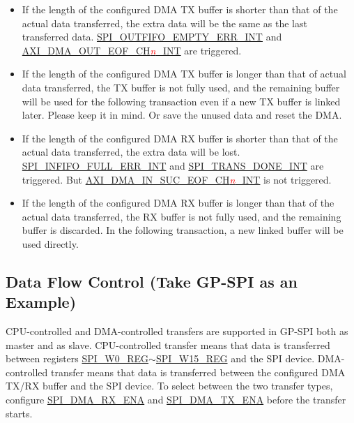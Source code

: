 \documentclass[main\_\_EN.tex]{subfiles}
\begin{document}
\begin{itemize}
    \item If the length of the configured DMA TX buffer is shorter than that of the actual data transferred, the extra data will be the same as the last transferred data. \hyperref[int:SPIOUTFIFOEMPTYERRINT]{SPI\_OUTFIFO\_EMPTY\_ERR\_INT} and \hyperref[int:GDMAOUTEOFINT]{AXI\_DMA\_OUT\_EOF\_CH\textcolor{red}{\it{n}}\_INT}  are triggered.

    \item If the length of the configured DMA TX buffer is longer than that of actual data transferred, the TX buffer is not fully used, and the remaining buffer will be used for the following transaction even if a new TX buffer is linked later. Please keep it in mind. Or save the unused data and reset the DMA.

    \item If the length of the configured DMA RX buffer is shorter than that of the actual data transferred, the extra data will be lost. \hyperref[int:SPIINFIFOFULLERRINT]{SPI\_INFIFO\_FULL\_ERR\_INT} and \hyperref[int:SPITRANSDONEINT]{SPI\_TRANS\_DONE\_INT} are triggered. But \hyperref[int:GDMAINSUCEOFINT]{AXI\_DMA\_IN\_SUC\_EOF\_CH\textcolor{red}{\it{n}}\_INT}  is not triggered.

    \item If the length of the configured DMA RX buffer is longer than that of the actual data transferred, the RX buffer is not fully used, and the remaining buffer is discarded. In the following transaction, a new linked buffer will be used directly.

\end{itemize}

\subsection{Data Flow Control (Take GP-SPI as an Example)}\label{Subsection:Data Flow Control in GP-SPI Master and Slave Mode}

CPU-controlled and DMA-controlled transfers are supported in GP-SPI both as master and as slave.
CPU-controlled transfer means that data is transferred between registers \hyperref[regdesc:SPIW0REG]{SPI\_W0\_REG}$\sim$\hyperref[regdesc:SPIW15REG]{SPI\_W15\_REG} and the SPI device. DMA-controlled transfer means that data is transferred between the configured DMA TX/RX buffer and the SPI device. To select between the two transfer types, configure \hyperref[fielddesc:SPIDMARXENA]{SPI\_DMA\_RX\_ENA} and \hyperref[fielddesc:SPIDMATXENA]{SPI\_DMA\_TX\_ENA} before the transfer starts.
\end{document}
